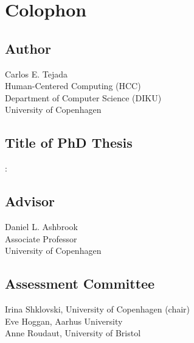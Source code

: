 \pagestyle{empty}


\section*{Colophon}
	\bigskip

	\noindent
	
	\subsection*{Author}
	Carlos E. Tejada\\
	Human-Centered Computing (HCC)\\
	Department of Computer Science (DIKU)\\
	University of Copenhagen
	
	\subsection*{Title of PhD Thesis}
	\myTitle: \mySubtitle
	
	\subsection*{Advisor}
	Daniel L. Ashbrook\\
	Associate Professor\\
	University of Copenhagen
	
	\subsection*{Assessment Committee}
	Irina Shklovski, University of Copenhagen (chair)\\
	Eve Hoggan, Aarhus University\\
	Anne Roudaut, University of Bristol